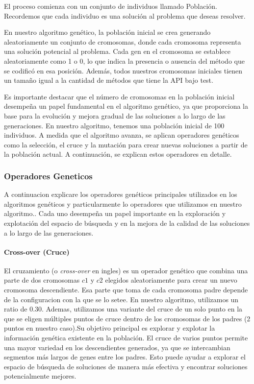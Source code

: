 El proceso comienza con un conjunto de individuos llamado Población. Recordemos que cada individuo es una solución al problema que deseas resolver.

En nuestro algoritmo genético, la población inicial se crea generando aleatoriamente un conjunto de cromosomas, donde cada cromosoma representa una solución potencial al problema. Cada gen en el cromosoma se establece aleatoriamente como 1 o 0, lo que indica la presencia o ausencia del método que se codificó en esa posición. Además, todos nuestros cromosomas iniciales tienen un tamaño igual a la cantidad de métodos que tiene la API bajo test.

Es importante destacar que el número de cromosomas en la población inicial desempeña un papel fundamental en el algoritmo genético, ya que proporciona la base para la evolución y mejora gradual de las soluciones a lo largo de las generaciones. En nuestro algoritmo, tenemos una población inicial de 100 individuos. A medida que el algoritmo avanza, se aplican operadores genéticos como la selección, el cruce y la mutación para crear nuevas soluciones a partir de la población actual. A continuación, se explican estos operadores en detalle.

\subsubsection{Operadores Geneticos}

A continuacion explicare los operadores genéticos principales utilizados en los algoritmos genéticos y particularmente lo operadores que utilizamos en nuestro algoritmo.. Cada uno desempeña un papel importante en la exploración y explotación del espacio de búsqueda y en la mejora de la calidad de las soluciones a lo largo de las generaciones.

\paragraph{Cross-over (Cruce)}

El cruzamiento (o \emph{cross-over} en ingles) es un operador genético que combina una parte de dos cromosomas $c1$ y $c2$ elegidos aleatoriamente para crear un nuevo cromosoma descendiente. Esa parte que toma de cada cromosoma padre depende de la configuracion con la que se lo setee. En nuestro algoritmo, utilizamos un ratio de 0.30. Ademas, utilizamos una variante del cruce de un solo punto en la que se eligen múltiples puntos de cruce dentro de los cromosomas de los padres (2 puntos en nuestro caso).Su objetivo principal es explorar y explotar la información genética existente en la población.
El cruce de varios puntos permite una mayor variedad en los descendientes generados, ya que se intercambian segmentos más largos de genes entre los padres. Esto puede ayudar a explorar el espacio de búsqueda de soluciones de manera más efectiva y encontrar soluciones potencialmente mejores.

